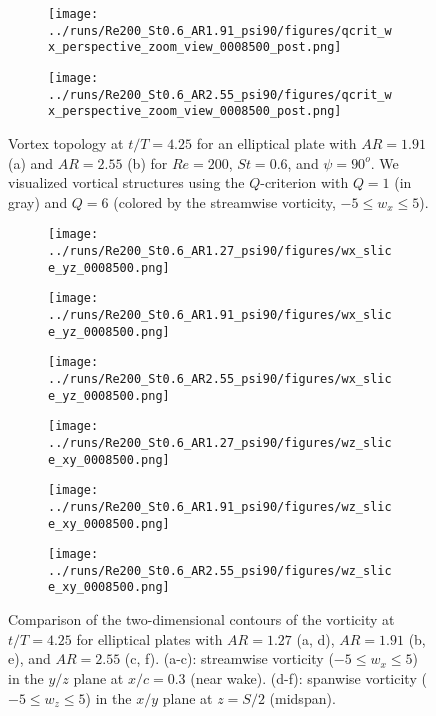 \begin{figure}
  \centering
  \begin{subfigure}[c]{0.45\textwidth}
    \centering
    \texttt{[image: ../runs/Re200\_St0.6\_AR1.91\_psi90/figures/qcrit\_wx\_perspective\_zoom\_view\_0008500\_post.png]}
    \caption{}
  \end{subfigure}
  \hfill
  \begin{subfigure}[c]{0.45\textwidth}
    \centering
    \texttt{[image: ../runs/Re200\_St0.6\_AR2.55\_psi90/figures/qcrit\_wx\_perspective\_zoom\_view\_0008500\_post.png]}
    \caption{}
  \end{subfigure}
  \caption{Vortex topology at $t / T = 4.25$ for an elliptical plate with $AR = 1.91$ (a) and $AR = 2.55$ (b) for $Re = 200$, $St = 0.6$, and $\psi = 90^o$. We visualized vortical structures using the $Q$-criterion with $Q = 1$ (in gray) and $Q = 6$ (colored by the streamwise vorticity, $-5 \leq w_x \leq 5$).}
  \label{fig:ratio_wake_topology}
\end{figure}

\begin{figure}
  \centering
  \begin{subfigure}[c]{0.3\textwidth}
    \centering
    \texttt{[image: ../runs/Re200\_St0.6\_AR1.27\_psi90/figures/wx\_slice\_yz\_0008500.png]}
    \caption{}
  \end{subfigure}
  \begin{subfigure}[c]{0.3\textwidth}
    \centering
    \texttt{[image: ../runs/Re200\_St0.6\_AR1.91\_psi90/figures/wx\_slice\_yz\_0008500.png]}
    \caption{}
  \end{subfigure}
  \begin{subfigure}[c]{0.34\textwidth}
    \centering
    \texttt{[image: ../runs/Re200\_St0.6\_AR2.55\_psi90/figures/wx\_slice\_yz\_0008500.png]}
    \caption{}
  \end{subfigure}
  \vspace{0.5cm}
  \begin{subfigure}[c]{0.32\textwidth}
    \centering
    \texttt{[image: ../runs/Re200\_St0.6\_AR1.27\_psi90/figures/wz\_slice\_xy\_0008500.png]}
    \caption{}
  \end{subfigure}
  \begin{subfigure}[c]{0.32\textwidth}
    \centering
    \texttt{[image: ../runs/Re200\_St0.6\_AR1.91\_psi90/figures/wz\_slice\_xy\_0008500.png]}
    \caption{}
  \end{subfigure}
  \begin{subfigure}[c]{0.32\textwidth}
    \centering
    \texttt{[image: ../runs/Re200\_St0.6\_AR2.55\_psi90/figures/wz\_slice\_xy\_0008500.png]}
    \caption{}
  \end{subfigure}
  \caption{Comparison of the two-dimensional contours of the vorticity at $t/T = 4.25$ for elliptical plates with $AR = 1.27$ (a, d), $AR = 1.91$ (b, e), and $AR = 2.55$ (c, f). (a-c): streamwise vorticity ($-5 \leq w_x \leq 5$) in the $y/z$ plane at $x/c = 0.3$ (near wake). (d-f): spanwise vorticity ($-5 \leq w_z \leq 5$) in the $x/y$ plane at $z = S/2$ (midspan).}
  \label{fig:ratio_vorticity_slices}
\end{figure}

